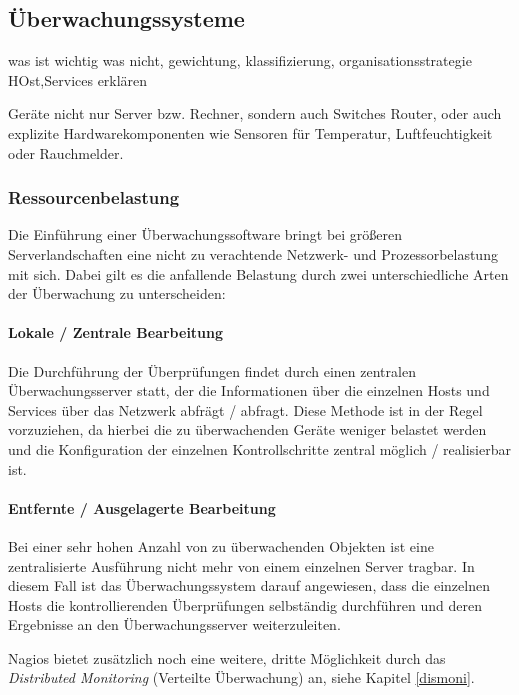 \subsection{Überwachungssysteme}
\begin{center}
was ist wichtig was nicht, gewichtung, klassifizierung, organisationsstrategie
HOst,Services erklären
\end{center}

Geräte nicht nur Server bzw. Rechner, sondern auch Switches Router, oder auch explizite Hardwarekomponenten wie Sensoren für Temperatur, Luftfeuchtigkeit oder Rauchmelder.

\subsubsection{Ressourcenbelastung}
Die Einführung einer Überwachungssoftware bringt bei größeren Serverlandschaften eine nicht zu verachtende Netzwerk- und Prozessorbelastung mit sich.
Dabei gilt es die anfallende Belastung durch zwei unterschiedliche Arten der Überwachung zu unterscheiden:

\paragraph{Lokale / Zentrale Bearbeitung}
Die Durchführung der Überprüfungen findet durch einen zentralen Überwachungsserver statt, der die Informationen über die einzelnen Hosts und Services über das Netzwerk abfrägt /  abfragt.
Diese Methode ist in der Regel vorzuziehen, da hierbei die zu überwachenden Geräte weniger belastet werden und die Konfiguration der einzelnen Kontrollschritte zentral möglich / realisierbar ist.

\paragraph{Entfernte / Ausgelagerte Bearbeitung}
Bei einer sehr hohen Anzahl von zu überwachenden Objekten ist eine zentralisierte Ausführung nicht mehr von einem einzelnen Server tragbar.
In diesem Fall ist das Überwachungssystem darauf angewiesen, dass die einzelnen Hosts die kontrollierenden Überprüfungen selbständig durchführen und deren Ergebnisse an den Überwachungsserver weiterzuleiten.

\newline


Nagios bietet zusätzlich noch eine weitere, dritte Möglichkeit durch das \textit{Distributed Monitoring} (Verteilte Überwachung) an, siehe Kapitel \ref{dismoni}.

